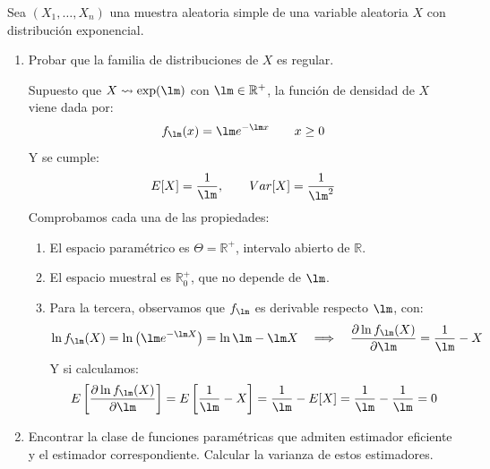 \begin{ejercicio}\label{ej:9_rel4} 
    Sea $(X_1, \ldots, X_n)$ una muestra aleatoria simple de una variable aleatoria $X$ con distribución exponencial.
    \begin{enumerate}[label=\alph*)]
        \item Probar que la familia de distribuciones de $X$ es regular.

            Supuesto que $X\rightsquigarrow \exp(\lm)$ con $\lm\in \mathbb{R}^+$, la función de densidad de $X$ viene dada por:
            \begin{equation*}
                f_\lm(x) = \lm e^{-\lm x} \qquad x\geq 0
            \end{equation*}
            Y se cumple:
            \begin{equation*}
                E[X] = \frac{1}{\lm}, \qquad Var[X] = \frac{1}{\lm^2}
            \end{equation*}
            Comprobamos cada una de las propiedades:
            \begin{enumerate}
                \item[$i)$] El espacio paramétrico es $\Theta=\mathbb{R}^+$, intervalo abierto de $\mathbb{R}$.
                \item[$ii)$] El espacio muestral es $\mathbb{R}^+_0$, que no depende de $\lm$.
                \item[$iii)$] Para la tercera, observamos que $f_\lm$ es derivable respecto $\lm$, con:
                    \begin{equation*}
                        \ln f_\lm(X) = \ln\left(\lm e^{-\lm X}\right) = \ln\lm - \lm X \quad \Longrightarrow \quad  \dfrac{\partial \ln f_\lm(X)}{\partial \lm} = \frac{1}{\lm} - X
                    \end{equation*}
                    Y si calculamos:
                    \begin{equation*}
                        E\left[\dfrac{\partial \ln f_\lm(X)}{\partial \lm}\right] = E\left[\frac{1}{\lm}-X\right] = \frac{1}{\lm}-E[X] = \frac{1}{\lm}-\frac{1}{\lm} = 0
                    \end{equation*}
            \end{enumerate}
        \item Encontrar la clase de funciones paramétricas que admiten estimador eficiente y el estimador correspondiente. Calcular la varianza de estos estimadores.


\end{enumerate}
\end{ejercicio}
